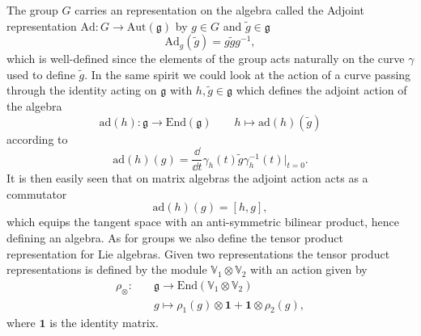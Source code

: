 The group $G$ carries an representation on the algebra called the Adjoint representation $\text{Ad}: G\to \text{Aut}(\mathfrak{g})$ by $g\in G$ and $\tilde{g}\in\mathfrak{g}$
\begin{equation}\label{eq:Liegrouprep}
    \text{Ad}_g(\tilde{g}) = g\tilde{g}g^{-1},
\end{equation}
which is well-defined since the elements of the group acts naturally on the curve $\gamma$ used to define $\tilde{g}$. In the same spirit we could look at the action of a curve passing through the identity acting on $\mathfrak{g}$ with $h,\tilde{g}\in \mathfrak{g}$ which defines the adjoint action of the algebra 
\begin{equation}
    \text{ad}(h): \mathfrak{g}\to \text{End}(\mathfrak{g})\qquad h\mapsto \text{ad}(h)(\tilde{g})
\end{equation}
according to 
\begin{equation}
    \text{ad}(h)(g) = \frac{\dd}{\dd t}\gamma_h(t)\tilde{g}\gamma_h^{-1}(t)|_{t=0}.
\end{equation}
It is then easily seen that on matrix algebras the adjoint action acts as a commutator 
\begin{equation}
    \text{ad}(h)(g) = [h,g],
\end{equation}
which equips the tangent space with an anti-symmetric bilinear product, hence defining an algebra. As for groups we also define the tensor product representation for Lie algebras. Given two representations the tensor product representations is defined by the module $\mathbb{V}_1\otimes\mathbb{V}_2$ with an action given by 
\begin{equation}
    \begin{aligned}
        \rho_\otimes:\quad &\mathfrak{g}\to\text{End}\left(\mathbb{V}_1\otimes\mathbb{V}_2\right) \\
                & g\mapsto \rho_1(g)\otimes \mathbf{1}+\mathbf{1}\otimes\rho_2(g),
    \end{aligned}
\end{equation}
where $\mathbf{1}$ is the identity matrix.


